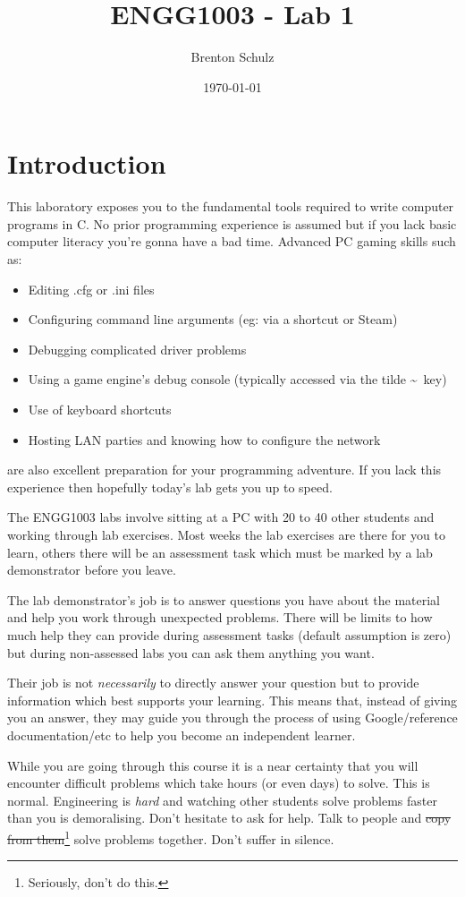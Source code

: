 \documentclass{lab}
\title{ENGG1003 - Lab 1}
\author{Brenton Schulz}
\date{\today}
\begin{document}
\maketitle

\section{Introduction}
This laboratory exposes you to the fundamental tools required to write computer programs in C. No prior programming experience is assumed but if you lack basic computer literacy you're gonna have a bad time. Advanced PC gaming skills such as:

\begin{itemize}
\item Editing .cfg or .ini files
\item Configuring command line arguments (eg: via a shortcut or Steam)
\item Debugging complicated driver problems
\item Using a game engine's debug console (typically accessed via the tilde \textasciitilde\ key)
\item Use of keyboard shortcuts
\item Hosting LAN parties and knowing how to configure the network
\end{itemize}

are also excellent preparation for your programming adventure. If you lack this experience then hopefully today's lab gets you up to speed.

The ENGG1003 labs involve sitting at a PC with 20 to 40 other students and working through lab exercises. Most weeks the lab exercises are there for you to learn, others there will be an assessment task which must be marked by a lab demonstrator before you leave.

The lab demonstrator's job is to answer questions you have about the material and help you work through unexpected problems. There will be limits to how much help they can provide during assessment tasks (default assumption is zero) but during non-assessed labs you can ask them anything you want.

Their job is not \textit{necessarily} to directly answer your question but to provide information which best supports your learning. This means that, instead of giving you an answer, they may guide you through the process of using Google/reference documentation/etc to help you become an independent learner.

While you are going through this course it is a near certainty that you will encounter difficult problems which take hours (or even days) to solve. This is normal. Engineering is \textit{hard} and watching other students solve problems faster than you is demoralising. Don't hesitate to ask for help. Talk to people and \st{copy from them}\footnote{Seriously, don't do this.} solve problems together. Don't suffer in silence.
\end{document}
